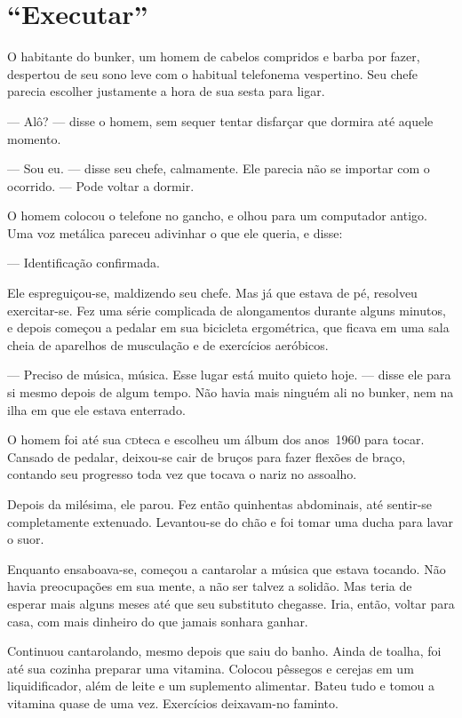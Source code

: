 \chapter{“Executar”}


O habitante do bunker, um homem de cabelos compridos e barba por fazer,
despertou de seu sono leve com o habitual telefonema vespertino. Seu
chefe parecia escolher justamente a hora de sua sesta para ligar.

--- Alô? --- disse o homem, sem sequer tentar disfarçar que dormira até
aquele momento.

--- Sou eu. --- disse seu chefe, calmamente. Ele parecia não se importar
com o ocorrido. --- Pode voltar a dormir.

O homem colocou o telefone no gancho, e olhou para um computador antigo.
Uma voz metálica pareceu adivinhar o que ele queria, e disse:

--- Identificação confirmada.

Ele espreguiçou-se, maldizendo seu chefe. Mas já que estava de pé,
resolveu exer\-ci\-tar-se. Fez uma série complicada de alongamentos durante
alguns minutos, e depois começou a pedalar em sua bicicleta ergométrica,
que ficava em uma sala cheia de aparelhos de musculação e de exercícios
aeróbicos.

--- Preciso de música, música. Esse lugar está muito quieto hoje. ---
disse ele para si mesmo depois de algum tempo. Não havia mais ninguém
ali no bunker, nem na ilha em que ele estava enterrado.

O homem foi até sua \textsc{cd}teca e escolheu um álbum dos anos~1960
para tocar. Cansado de pedalar, deixou-se cair de bruços para fazer
flexões de braço, contando seu progresso toda vez que tocava o nariz no
assoalho.

Depois da milésima, ele parou. Fez então quinhentas abdominais, até
sentir-se completamente extenuado. Levantou-se do chão e foi tomar uma
ducha para lavar o suor.

Enquanto ensaboava-se, começou a cantarolar a música que estava tocando.
Não havia preocupações em sua mente, a não ser talvez a solidão. Mas
teria de esperar mais alguns meses até que seu substituto chegasse.
Iria, então, voltar para casa, com mais dinheiro do que jamais sonhara
ganhar.

Continuou cantarolando, mesmo depois que saiu do banho. Ainda de toalha,
foi até sua cozinha preparar uma vitamina. Colocou pêssegos e cerejas em
um liquidificador, além de leite e um suplemento alimentar. Bateu tudo e
tomou a vitamina quase de uma vez. Exercícios deixavam-no faminto.

